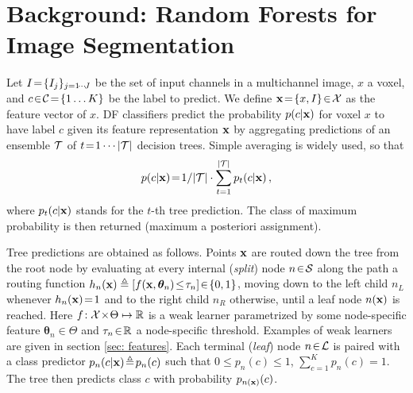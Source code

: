 
\section{Background: Random Forests for Image Segmentation}
\label{sec: background}

Let $I\!=\!\{I_j\}_{j=1\!\cdots\! J}$ be the set of input channels in a multichannel image, $x$ a voxel, and $c\!\in\!\mathcal{C}\!=\!\{1 \dots K\}$ be the label to predict. We define $\boldsymbol{\mathrm{x}}\!=\!\{x,I\}\!\in\!\mathcal{X}$ as the feature vector of $x$. DF classifiers predict the probability $p(c\vert\boldsymbol{\mathrm{x}})$ for voxel $x$ to have label $c$ given its feature representation $\boldsymbol{\mathrm{x}}$ by aggregating predictions of an ensemble $\mathcal{T}$ of $t\!=\!1\cdots \vert\mathcal{T}\vert$ decision trees. Simple averaging is widely used, so that 
$$p(c\vert\boldsymbol{\mathrm{x}})\!=\!1/\vert\mathcal{T}\vert\cdot\sum_{t=1}^{\vert\mathcal{T}\vert}p_t(c\vert\boldsymbol{\mathrm{x}})\, ,$$
where $p_t(c\vert\boldsymbol{\mathrm{x}})$ stands for the $t$-th tree prediction. The class of maximum probability is then returned (maximum a posteriori assignment). 

Tree predictions are obtained as follows. Points $\boldsymbol{\mathrm{x}}$ are routed down the tree from the root node by evaluating at every internal (\textit{split}) node $n\!\in\!\mathcal{S}$ along the path a routing function $h_n(\boldsymbol{\mathrm{x}})\triangleq[f(\boldsymbol{\mathrm{x}},\bm{\theta}_n)\!\leq\!\tau_n]\!\in\!\{0,1\}$, moving down to the left child $n_L$ whenever $h_n(\boldsymbol{\mathrm{x}})\!=\!1$ and to the right child $n_R$ otherwise, until a leaf node $n(\boldsymbol{\mathrm{x}})$ is reached. Here $f\!:\mathcal{X}\!\times\!\Theta\mapsto\mathbb{R}$ is a weak learner parametrized by some node-specific feature $\bm{\theta}_n\!\in\!\Theta$ and $\tau_n\!\in\!\mathbb{R}$ a node-specific threshold. Examples of weak learners are given in section \ref{sec: features}. Each terminal (\textit{leaf}) node $n\!\in\!\mathcal{L}$ is paired with a class predictor $p_n(c\vert \boldsymbol{\mathrm{x}})\!\triangleq\!p_n(c)$ such that $0\!\leq\!p_n(c)\!\leq\!1$, $\sum_{c=1}^Kp_n(c)\!=\!1$. The tree then predicts class $c$ with probability $p_{n(\boldsymbol{\mathrm{x}})}(c)$. 


